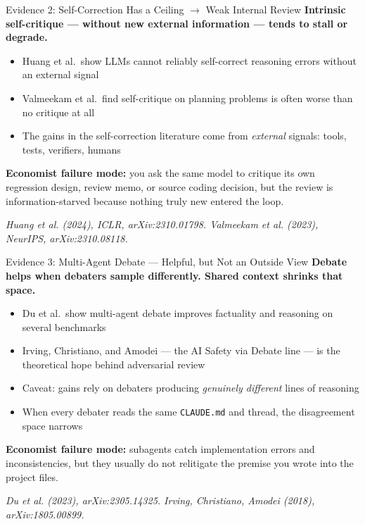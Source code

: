 \documentclass[10pt,english,aspectratio=169]{beamer}
\begin{document}
\begin{frame}{Evidence 2: Self-Correction Has a Ceiling $\rightarrow$ Weak Internal Review}
\textbf{Intrinsic self-critique --- without new external information --- tends to stall or degrade.}

\vspace{0.25cm}

\begin{itemize}
    \item Huang et al.\ show LLMs cannot reliably self-correct reasoning errors without an external signal
    \item Valmeekam et al.\ find self-critique on planning problems is often worse than no critique at all
    \item The gains in the self-correction literature come from \textit{external} signals: tools, tests, verifiers, humans
\end{itemize}

\vspace{0.25cm}

\textbf{Economist failure mode:} you ask the same model to critique its own regression design, review memo, or source coding decision, but the review is information-starved because nothing truly new entered the loop.

\vspace{0.15cm}
{\scriptsize \textit{Huang et al. (2024), ICLR, arXiv:2310.01798. Valmeekam et al. (2023), NeurIPS, arXiv:2310.08118.}}
\end{frame}

\begin{frame}{Evidence 3: Multi-Agent Debate --- Helpful, but Not an Outside View}
\textbf{Debate helps when debaters sample differently. Shared context shrinks that space.}

\vspace{0.2cm}

\begin{itemize}
    \item Du et al.\ show multi-agent debate improves factuality and reasoning on several benchmarks
    \item Irving, Christiano, and Amodei --- the AI Safety via Debate line --- is the theoretical hope behind adversarial review
    \item Caveat: gains rely on debaters producing \textit{genuinely different} lines of reasoning
    \item When every debater reads the same \texttt{CLAUDE.md} and thread, the disagreement space narrows
\end{itemize}

\vspace{0.2cm}

\textbf{Economist failure mode:} subagents catch implementation errors and inconsistencies, but they usually do not relitigate the premise you wrote into the project files.

\vspace{0.15cm}
{\scriptsize \textit{Du et al. (2023), arXiv:2305.14325. Irving, Christiano, Amodei (2018), arXiv:1805.00899.}}
\end{frame}
\end{document}
